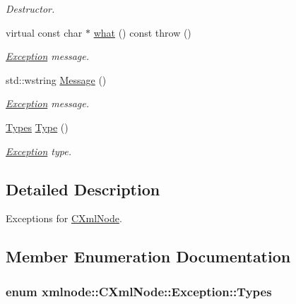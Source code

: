 \begin{DoxyCompactItemize}
\begin{DoxyCompactList}\small\item\em Destructor. \end{DoxyCompactList}\item 
virtual const char $\ast$ \hyperlink{classxmlnode_1_1_c_xml_node_1_1_exception_a8313d9c1ddeaa684efc9b1be812ad39b}{what} () const   throw ()
\begin{DoxyCompactList}\small\item\em \hyperlink{classxmlnode_1_1_c_xml_node_1_1_exception}{Exception} message. \end{DoxyCompactList}\item 
std\+::wstring \hyperlink{classxmlnode_1_1_c_xml_node_1_1_exception_a29271ad0ec50958663200f60aaae97b2}{Message} ()
\begin{DoxyCompactList}\small\item\em \hyperlink{classxmlnode_1_1_c_xml_node_1_1_exception}{Exception} message. \end{DoxyCompactList}\item 
\hyperlink{classxmlnode_1_1_c_xml_node_1_1_exception_abdbe07531ef4b19192f1fa2f819ed75f}{Types} \hyperlink{classxmlnode_1_1_c_xml_node_1_1_exception_a872eb6da8739faf5424baf6515b43793}{Type} ()
\begin{DoxyCompactList}\small\item\em \hyperlink{classxmlnode_1_1_c_xml_node_1_1_exception}{Exception} type. \end{DoxyCompactList}\end{DoxyCompactItemize}


\subsection{Detailed Description}
Exceptions for \hyperlink{classxmlnode_1_1_c_xml_node}{C\+Xml\+Node}. 

\subsection{Member Enumeration Documentation}
\hypertarget{classxmlnode_1_1_c_xml_node_1_1_exception_abdbe07531ef4b19192f1fa2f819ed75f}{
\subsubsection[{Types}]{\setlength{\rightskip}{0pt plus 5cm}enum {\bf xmlnode\+::\+C\+Xml\+Node\+::\+Exception\+::\+Types}}}\label{classxmlnode_1_1_c_xml_node_1_1_exception_abdbe07531ef4b19192f1fa2f819ed75f}


